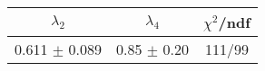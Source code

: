 \begin{tabular}{c|c||c}
$\lambda_{2}$ & $\lambda_4$ & $\chi^{2}$/ndf \\
\hline
0.611 $\pm$ 0.089 & 0.85 $\pm$ 0.20 & 111/99\\
\end{tabular}
